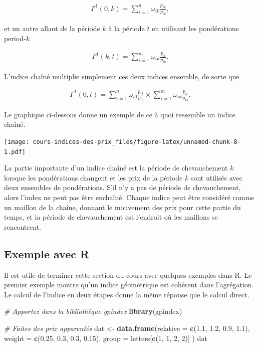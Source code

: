 \documentclass[]{article}
\newenvironment{Shaded}{\begin{snugshade}}{\end{snugshade}}
\newcommand{\CommentTok}[1]{\textcolor[rgb]{0.56,0.35,0.01}{\textit{#1}}}
\newcommand{\DataTypeTok}[1]{\textcolor[rgb]{0.13,0.29,0.53}{#1}}
\newcommand{\DecValTok}[1]{\textcolor[rgb]{0.00,0.00,0.81}{#1}}
\newcommand{\FloatTok}[1]{\textcolor[rgb]{0.00,0.00,0.81}{#1}}
\newcommand{\KeywordTok}[1]{\textcolor[rgb]{0.13,0.29,0.53}{\textbf{#1}}}
\newcommand{\NormalTok}[1]{#1}
\newcommand{\StringTok}[1]{\textcolor[rgb]{0.31,0.60,0.02}{#1}}
\begin{document}
\begin{align*}
I^{A}(0, k) = \sum_{i = 1}^{n} \omega_{i0} \frac{p_{ik}}{p_{i0}},
\end{align*}

et un autre allant de la période \(k\) à la période \(t\) en utilisant les pondérations period-\(k\)

\begin{align*}
I^{A}(k, t) = \sum_{i = 1}^{m} \omega_{ik} \frac{p_{it}}{p_{ik}}.
\end{align*}

L'indice chaîné multiplie simplement ces deux indices ensemble, de sorte que

\begin{align*}
I^{A}(0, t) = \sum_{i = 1}^{n} \omega_{i0} \frac{p_{ik}}{p_{i0}} \times \sum_{i = 1}^{m} \omega_{ik} \frac{p_{it}}{p_{ik}}.
\end{align*}

Le graphique ci-dessous donne un exemple de ce à quoi ressemble un indice chaîné.

\texttt{[image: cours-indices-des-prix\_files/figure-latex/unnamed-chunk-8-1.pdf]}

La partie importante d'un indice chaîné est la période de chevauchement \(k\) lorsque les pondérations changent et les prix de la période \(k\) sont utilisés avec deux ensembles de pondérations. S'il n'y a pas de période de chevauchement, alors l'index ne peut pas être enchaîné. Chaque indice peut être considéré comme un maillon de la chaîne, donnant le mouvement des prix pour cette partie du temps, et la période de chevauchement est l'endroit où les maillons se rencontrent.

\hypertarget{exemple-avec-r-1}{%
\subsection{Exemple avec R}\label{exemple-avec-r-1}}

Il est utile de terminer cette section du cours avec quelques exemples dans R. Le premier exemple montre qu'un indice géométrique est cohérent dans l'agrégation. Le calcul de l'indice en deux étapes donne la même réponse que le calcul direct.

\begin{Shaded}
\begin{Highlighting}[]
\CommentTok{# Apportez dans la bibliothèque gpindex}
\KeywordTok{library}\NormalTok{(gpindex)}

\CommentTok{# Faites des prix apparentés}
\NormalTok{dat <-}\StringTok{ }\KeywordTok{data.frame}\NormalTok{(}\DataTypeTok{relative =} \KeywordTok{c}\NormalTok{(}\FloatTok{1.1}\NormalTok{, }\FloatTok{1.2}\NormalTok{, }\FloatTok{0.9}\NormalTok{, }\FloatTok{1.1}\NormalTok{),}
                  \DataTypeTok{weight =} \KeywordTok{c}\NormalTok{(}\FloatTok{0.25}\NormalTok{, }\FloatTok{0.3}\NormalTok{, }\FloatTok{0.3}\NormalTok{, }\FloatTok{0.15}\NormalTok{),}
                  \DataTypeTok{group =}\NormalTok{ letters[}\KeywordTok{c}\NormalTok{(}\DecValTok{1}\NormalTok{, }\DecValTok{1}\NormalTok{, }\DecValTok{2}\NormalTok{, }\DecValTok{2}\NormalTok{)]}
\NormalTok{)}
\NormalTok{dat}
\end{Highlighting}
\end{Shaded}
\end{document}

